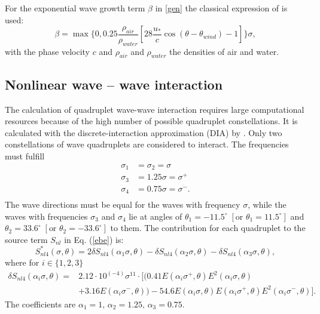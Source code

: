 For the exponential wave growth term $\beta$ in \eqref{gen} the classical 
expression of \citep[][]{komen1984} is used:
\begin{equation}
 \beta = \max \{ 0,0.25 \frac{\rho_{air}}{\rho_{water}} \left[28 
\frac{u_\ast}{c} \cos(\theta - \theta_{wind}) -1 \right] \} \sigma,
\end{equation}
with the phase velocity $c$ and $\rho_{air}$ and $\rho_{water}$ the densities of 
air and water.

\subsection{Nonlinear wave -- wave interaction}

The calculation of quadruplet wave-wave interaction requires large 
computational resources because of the high number of possible quadruplet 
constellations. It is calculated with the discrete-interaction approximation 
(DIA) by \citep[][]{hasselmann1985}. Only two constellations of wave 
quadruplets 
are considered to interact. The frequencies must fulfill
\begin{align*}
 \sigma_1 &= \sigma_2 = \sigma \\
 \sigma_3 &= 1.25 \sigma = \sigma^+ \\
 \sigma_4 &= 0.75 \sigma = \sigma^- .\\
\end{align*}
The wave directions must be equal for the waves with frequency $\sigma$, while 
the waves with frequencies $\sigma_3$ and $\sigma_4$ lie at angles of $\theta_1 
= -11.5^\circ \; \left[ \text{or } \theta_1 = 11.5^\circ \right]$ and $\theta_2 
= 33.6^\circ \; \left[ \text{or } \theta_2 = -33.6^\circ \right]$  to them. The 
contribution for each quadruplet to the source term $S_{nl}$ in Eq. (\ref{ebe}) 
is:
\begin{equation}
 S_{nl4}^\ast (\sigma, \theta) = 2 \delta S_{nl4} (\alpha_1 \sigma, \theta) - 
\delta S_{nl4} (\alpha_2 \sigma, \theta) - \delta S_{nl4} (\alpha_3 \sigma, 
\theta),
\end{equation}
where for $i \in \{1,2,3\}$
\begin{align*}
 \delta S_{nl4} ( \alpha_i \sigma, \theta ) = & 2.12 \cdot 10^{(-4)} \sigma^{11} 
\cdot [ ( 0.41 E(\alpha_i \sigma^+, \theta)E^2(\alpha_i \sigma, \theta) \\
 &+ 3.16 E(\alpha_i \sigma^-, \theta) ) - 54.6 E(\alpha_i \sigma, \theta) 
E(\alpha_i \sigma^+, \theta) E^2(\alpha_i \sigma^-, \theta) ] .
\end{align*}
The coefficients are $\alpha_1 = 1, \, \alpha_2 = 1.25, \, \alpha_3 = 0.75$. 

